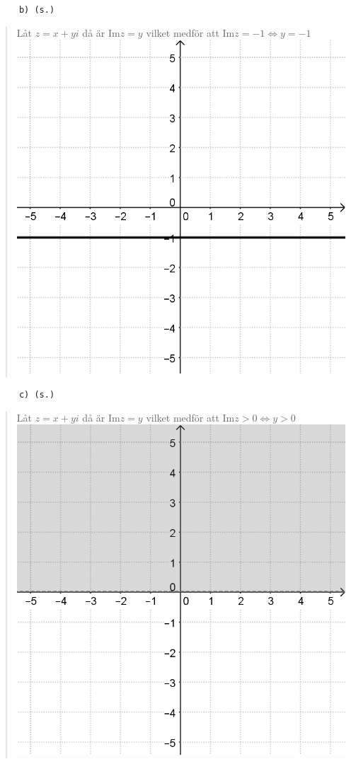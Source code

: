 \documentclass[a4paper]{article}
\newcommand{\tskcol}[1]{\textcolor{tskcol}{#1}}
\begin{document}
	\texttt{\tskcol{~~~~~~b) (s.)}}
	\begin{quotation}
		\noindent
		Låt $z=x+yi$ då är Im$z=y$  vilket medför att Im$z=-1 \Leftrightarrow y=-1$ \\
		\includegraphics[scale=0.2]{images/610b.PNG}
	\end{quotation}
	
	\texttt{\tskcol{~~~~~~c) (s.)}}
	\begin{quotation}
		\noindent
		Låt $z=x+yi$ då är Im$z=y$  vilket medför att Im$z>0 \Leftrightarrow y>0$ \\
		\includegraphics[scale=0.2]{images/610c.PNG}
	\end{quotation}
	
\end{document}
